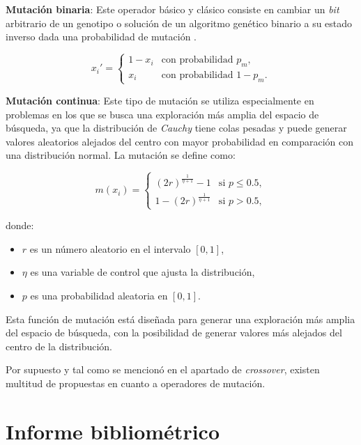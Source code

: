 \documentclass[12pt,letterpaper]{article}
\begin{document}
\textbf{Mutación binaria}: Este operador básico y clásico consiste en cambiar un \textit{bit} arbitrario de un genotipo o solución de un algoritmo genético binario a su estado inverso dada una probabilidad de mutación \cite{mirjalili2019genetic}.

\begin{equation}
x_i' = 
\begin{cases}
1 - x_i & \text{con probabilidad } p_m, \\
x_i     & \text{con probabilidad } 1 - p_m.
\end{cases}
\label{eq:binary_mutation}
\end{equation}

\textbf{Mutación continua}: Este tipo de mutación se utiliza especialmente en problemas en los que se busca una exploración más amplia del espacio de búsqueda, ya que la distribución de \textit{Cauchy} tiene colas pesadas y puede generar valores aleatorios alejados del centro con mayor probabilidad en comparación con una distribución normal. La mutación se define como:

\begin{equation}
m(x_i) = 
\begin{cases}
(2r)^{\frac{1}{\eta + 1}} - 1 & \text{si } p \leq 0.5, \\
1 - (2r)^{\frac{1}{\eta + 1}} & \text{si } p > 0.5,
\end{cases}
\label{eq:cauchy_mutation}
\end{equation}

donde:
\begin{itemize}
    \item \( r \) es un número aleatorio en el intervalo \([0, 1]\),
    \item \( \eta \) es una variable de control que ajusta la distribución,
    \item \( p \) es una probabilidad aleatoria en \([0, 1]\).
\end{itemize}

Esta función de mutación está diseñada para generar una exploración más amplia del espacio de búsqueda, con la posibilidad de generar valores más alejados del centro de la distribución.

Por supuesto y tal como se mencionó en el apartado de \textit{crossover}, existen multitud de propuestas en cuanto a operadores de mutación.

\section{Informe bibliométrico}
\end{document}
